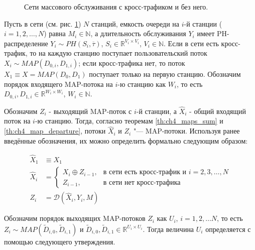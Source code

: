 \begin{figure}[htb]
  \caption{Сети массового обслуживания с кросс-трафиком и без него.}
  \label{fig:ch4_queueing_networks}
\end{figure}

Пусть в сети (см. рис. \ref{fig:ch4_queueing_networks}) $N$ станций, емкость очереди на $i$-й станции ($i = 1,2, \dots, N$) равна $M_i \in \mathbb{N}$, а длительность обслуживания $Y_i$ имеет PH-распределение $Y_i \sim PH(S_i, \overline{\tau})$, $S_i \in \mathbb{R}^{V_i \times V_i}$, $V_i \in \mathbb{N}$. Если в сети есть кросс-трафик, то на каждую станцию поступает пользовательский поток $X_i \sim MAP(D_{0,i}, D_{1,i})$; если кросс-трафика нет, то поток $X_1 \equiv X = MAP(D_0, D_1)$ поступает только на первую станцию. Обозначим порядок входящего MAP-потока на $i$-ю станцию как $W_i$, то есть $D_{0,i}, D_{1,i} \in \mathbb{R}^{W_i \times W_i}$, $W_i \in \mathbb{N}$.

Обозначим $Z_i$ - выходящий MAP-поток с $i$-й станции, а $\hat{X}_i$ - общий входящий поток на $i$-ю станцию. Тогда, согласно теоремам \ref{th:ch4_maps_sum} и \ref{th:ch4_map_departure}, потоки $\hat{X}_i$ и $Z_i$ "--- MAP-потоки. Используя ранее введённые обозначения, их можно определить формально следующим образом:

\begin{equation}
  \label{eq:ch4_total_arrival_and_departure}
  \begin{aligned}
    \hat{X}_1 &\equiv X_1\\
    \hat{X}_i &= \begin{cases}
      X_i \oplus Z_{i-1},&\text{в сети есть кросс-трафик и } i = 2,3, \dots, N\\
      Z_{i-1},&\text{в сети нет кросс-трафика}
    \end{cases}\\
    Z_i &= \mathcal{D}(\hat{X}_i, Y_i, M)
  \end{aligned}
\end{equation}

Обозначим порядок выходящих MAP-потоков $Z_i$ как $U_i$, $i=1,2,\dots N$, то есть $Z_i \sim MAP(\tilde{D}_{i,0}, \tilde{D}_{i,1})$ и $\tilde{D}_{i,0}, \tilde{D}_{i,1} \in \mathbb{R}^{U_i \times U_i}$. Тогда величина $U_i$ определяется с помощью следующего утверждения.

